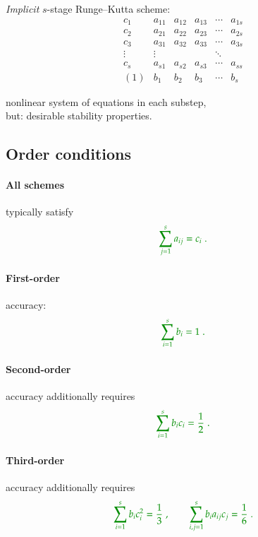 \documentclass[\mydriver,12pt,twoside,notitlepage]{article}
\newcommand{\ColEmph}[1]{{\color{DarkishRed}#1}}
\newcommand{\colEmph}[1]{{\color{DarkishBlue}#1}}
\begin{document}
\emph{Implicit} $s$-stage Runge--Kutta scheme:
\begin{equation}
  \begin{array}{c|ccccc}
    c_1    & a_{11} & a_{12} & a_{13} & \cdots & a_{1s} \\
    c_2    & a_{21} & a_{22} & a_{23} & \cdots & a_{2s} \\
    c_3    & a_{31} & a_{32} & a_{33} & \cdots & a_{3s} \\
    \vdots & \vdots &        &        & \ddots &        \\
    c_s    & a_{s1} & a_{s2} & a_{s3} & \cdots & a_{ss} \\
    \hline
    (1)    & b_1    & b_2    & b_3    & \cdots & b_s
  \end{array}
\end{equation}

\colEmph{nonlinear system of equations} in each substep,\\
\ColEmph{but}: desirable stability properties.

\clearpage

\subsection{Order conditions}

%
\paragraph{All schemes} typically satisfy
\begin{equation}
  \color{math}
  \sum\limits_{j=1}^{s} a_{ij} = c_i \; .
\end{equation}
%
\paragraph{First-order} accuracy:
\begin{equation}
  \color{math}
  \sum\limits_{i=1}^{s} b_{i} = 1 \; .  
\end{equation}

%
\paragraph{Second-order} accuracy additionally requires
\begin{equation}
  \color{math}
  \sum\limits_{i=1}^{s} b_{i} c_i = \dfrac{1}{2} \; .  
\end{equation}

%
\paragraph{Third-order} accuracy additionally requires
\begin{equation}
  \color{math}
  \sum\limits_{i=1}^{s} b_{i} c_i^2        = \dfrac{1}{3} \; ,
  \qquad
  \sum\limits_{i,j=1}^{s} b_{i} a_{ij} c_j = \dfrac{1}{6} \; .  
\end{equation}
\end{document}
